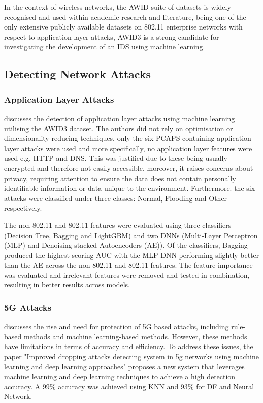 In the context of wireless networks, the AWID suite of datasets is widely recognised and used within academic research and literature, being one of the only extensive publicly available datasets on 802.11 enterprise networks with respect to application layer attacks, AWID3 is a strong candidate for investigating the development of an IDS using machine learning. 

\subsection{Detecting Network Attacks}

\subsubsection*{Application Layer Attacks}

\cite{s22155633} discusses the detection of application layer attacks using machine learning utilising the AWID3 dataset. The authors did not rely on optimisation or dimensionality-reducing techniques, only the six PCAPS containing application layer attacks were used and more specifically, no application layer features were used e.g. HTTP and DNS. This was justified due to these being usually encrypted and therefore not easily accessible, moreover, it raises concerns about privacy, requiring attention to ensure the data does not contain personally identifiable information or data unique to the environment. Furthermore. the six attacks were classified under three classes: Normal, Flooding and Other respectively.

The non-802.11 and 802.11 features were evaluated using three classifiers (Decision Tree, Bagging and LightGBM) and two DNNs (Multi-Layer Perceptron (MLP) and Denoising stacked Autoencoders (AE)). Of the classifiers, Bagging produced the highest scoring AUC with the MLP DNN performing slightly better than the AE across the non-802.11 and 802.11 features. The feature importance was evaluated and irrelevant features were removed and tested in combination, resulting in better results across models.

\subsubsection*{5G Attacks}

\cite{Mughaid2022} discusses the rise and need for protection of 5G based attacks, including rule-based methods and machine learning-based methods. However, these methods have limitations in terms of accuracy and efficiency. To address these issues, the paper "Improved dropping attacks detecting system in 5g networks using machine learning and deep learning approaches" proposes a new system that leverages machine learning and deep learning techniques to achieve a high detection accuracy. A 99\% accuracy was achieved using KNN and 93\% for DF and Neural Network.

